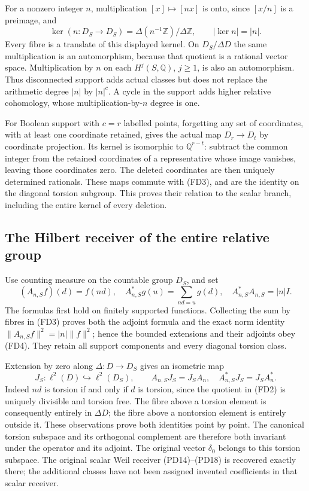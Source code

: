 For a nonzero integer $n$, multiplication $[x]\mapsto[nx]$ is onto,
since $[x/n]$ is a preimage, and
\[
 \ker(n:D_S\to D_S)
   =\Delta(n^{-1}\mathbb Z)/\Delta\mathbb Z,
 \qquad |\ker n|=|n|.
 \tag{FD3}
\]
Every fibre is a translate of this displayed kernel. On
$D_S/\Delta D$ the same multiplication is an automorphism, because
that quotient is a rational vector space. Multiplication by $n$ on
each $H^j(S,\mathbb Q)$, $j\ge1$, is also an automorphism.
Thus disconnected support adds actual classes but does not replace
the arithmetic degree $|n|$ by $|n|^c$. A cycle in the support adds
higher relative cohomology, whose multiplication-by-$n$ degree is one.

For Boolean support with $c=r$ labelled points, forgetting any set of
coordinates, with at least one coordinate retained, gives the actual
map $D_r\to D_t$ by coordinate projection. Its kernel is isomorphic
to $\mathbb Q^{r-t}$: subtract the common integer from the retained
coordinates of a representative whose image vanishes, leaving those
coordinates zero. The deleted coordinates are then uniquely determined
rationals. These maps commute with (FD3), and are the identity on the
diagonal torsion subgroup. This proves their relation to the scalar
branch, including the entire kernel of every deletion.

\subsection{The Hilbert receiver of the entire relative group}
Use counting measure on the countable group $D_S$, and set
\[
 (A_{n,S}f)(d)=f(nd),\quad
 A_{n,S}^*g(u)=\sum_{nd=u}g(d),\quad
 A_{n,S}^*A_{n,S}=|n|I.
 \tag{FD4}
\]
The formulas first hold on finitely supported functions. Collecting the
sum by fibres in (FD3) proves both the adjoint formula and the exact
norm identity $\|A_{n,S}f\|^2=|n|\|f\|^2$; hence the bounded
extensions and their adjoints obey (FD4). They retain all support
components and every diagonal torsion class.

Extension by zero along $\Delta:D\to D_S$ gives an isometric map
\[
 J_S:\ell^2(D)\hookrightarrow\ell^2(D_S),\qquad
 A_{n,S}J_S=J_S A_n,\quad A_{n,S}^*J_S=J_S A_n^*.
 \tag{FD5}
\]
Indeed $nd$ is torsion if and only if $d$ is torsion, since the quotient
in (FD2) is uniquely divisible and torsion free. The fibre above a
torsion element is consequently entirely in $\Delta D$; the fibre
above a nontorsion element is entirely outside it. These observations
prove both identities point by point. The canonical torsion subspace
and its orthogonal complement are therefore both invariant under the
operator and its adjoint. The original vector $\delta_{0}$ belongs to
this torsion subspace. The original scalar Weil receiver (PD14)--(PD18)
is recovered exactly there; the additional classes have not been
assigned invented coefficients in that scalar receiver.

